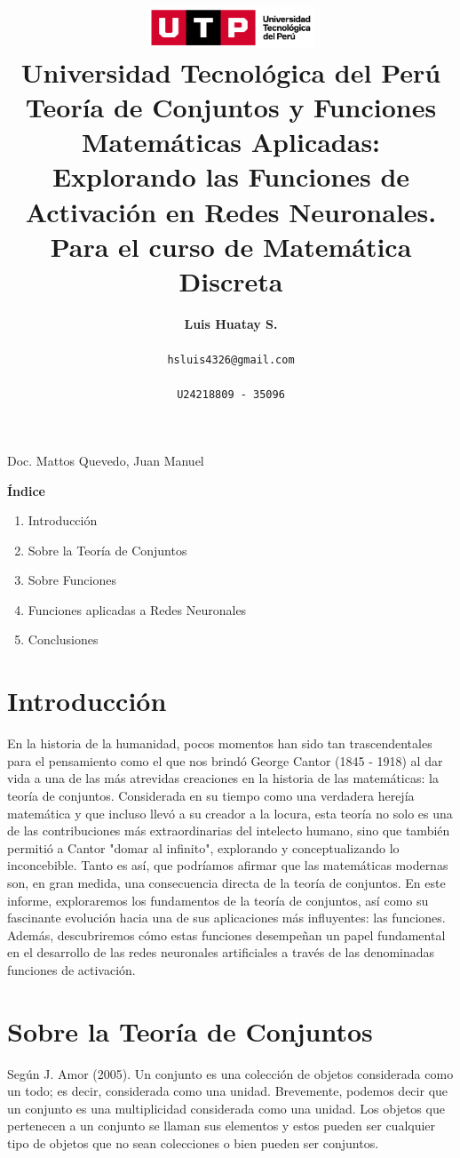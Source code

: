 \documentclass[11pt, a4paper]{article}
\title{
  \includegraphics[width=5cm]{./assets/logo-utp.png} \\
  \vspace{1cm}
  \textbf{Universidad Tecnológica del Perú} \\
  \vspace{3.5cm}
  \textbf{Teoría de Conjuntos y Funciones Matemáticas Aplicadas: Explorando las Funciones de Activación en Redes Neuronales.} \\ 
  \vspace{1cm}
  \large \textbf{Para el curso de Matemática Discreta}
}
\author{\textbf{Luis Huatay S.}\\\\\texttt{hsluis4326@gmail.com}\\\\\texttt{U24218809 - 35096}}
\begin{document}
\maketitle
\begin{center}
Doc. Mattos Quevedo, Juan Manuel
\end{center}
\restoregeometry

\newpage 

\textbf{Índice}
\begin{enumerate}
  \item Introducción
  \item Sobre la Teoría de Conjuntos
  \item Sobre Funciones
  \item Funciones aplicadas a Redes Neuronales
  \item Conclusiones
\end{enumerate}

\newpage
\vspace*{\fill}
\section{Introducción}
  En la historia de la humanidad, pocos momentos han sido tan trascendentales para el pensamiento como el que nos brindó George Cantor (1845 - 1918) al dar vida a una de las más atrevidas creaciones en la historia de las matemáticas: la teoría de conjuntos. Considerada en su tiempo como una verdadera herejía matemática y que incluso llevó a su creador a la locura, esta teoría no solo es una de las contribuciones más extraordinarias del intelecto humano, sino que también permitió a Cantor "domar al infinito", explorando y conceptualizando lo inconcebible. Tanto es así, que podríamos afirmar que las matemáticas modernas son, en gran medida, una consecuencia directa de la teoría de conjuntos. En este informe, exploraremos los fundamentos de la teoría de conjuntos, así como su fascinante evolución hacia una de sus aplicaciones más influyentes: las funciones. Además, descubriremos cómo estas funciones desempeñan un papel fundamental en el desarrollo de las redes neuronales artificiales a través de las denominadas funciones de activación.
\vspace*{\fill}

\newpage

\section{Sobre la Teoría de Conjuntos}
  Según J. Amor (2005). Un conjunto es una colección de objetos considerada como un todo; 
  es decir, considerada como una unidad. Brevemente, podemos decir que un conjunto es una multiplicidad considerada como una unidad. Los objetos que pertenecen a un conjunto se llaman sus elementos y estos pueden ser cualquier tipo de objetos que no sean colecciones o bien pueden ser conjuntos.
  
\end{document}

